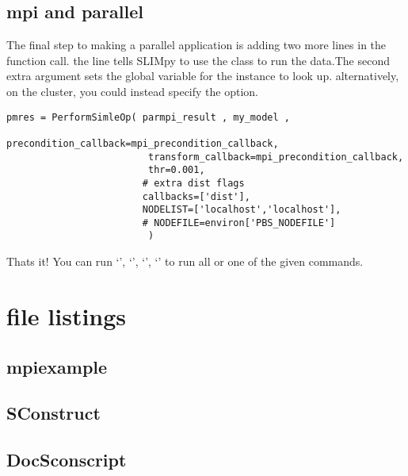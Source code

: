 \documentclass{manual}
\begin{document}
	\section{mpi and  parallel}

	The final step to making a parallel application is adding two more lines in the   function call. 
	the  line tells SLIMpy to use the  class to run the data.The second extra 
	argument  sets the global variable  for the  instance to look up.
	alternatively, on the cluster, you could instead  specify the  option.
\begin{verbatim}
pmres = PerformSimleOp( parmpi_result , my_model ,
                         precondition_callback=mpi_precondition_callback,
                         transform_callback=mpi_precondition_callback,
                         thr=0.001,
                        # extra dist flags 
                        callbacks=['dist'],
                        NODELIST=['localhost','localhost'],
                        # NODEFILE=environ['PBS_NODEFILE']
                         )
\end{verbatim}

Thats it! 
You can run `', `', `', `' to run all or one of the given commands.

\chapter{file listings}
\section{mpiexample}

\section{SConstruct}

\section{DocSconscript}


	
\end{document}
